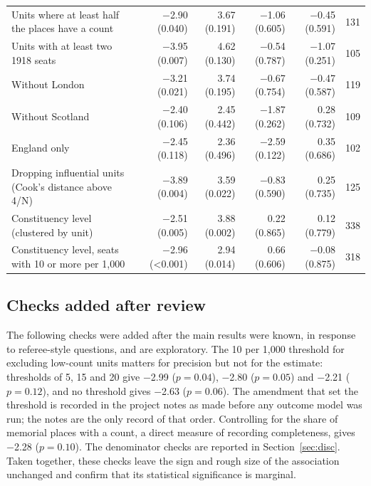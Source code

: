 \documentclass[11pt,a4paper]{article}
\begin{document}
\begin{table}[tbp]
\begin{tabular}{p{6.2cm}rrrrr}
Units where at least half the places have a count & $-$2.90 (0.040) & 3.67 (0.191) & $-$1.06 (0.605) & $-$0.45 (0.591) & 131\\
Units with at least two 1918 seats & $-$3.95 (0.007) & 4.62 (0.130) & $-$0.54 (0.787) & $-$1.07 (0.251) & 105\\
Without London & $-$3.21 (0.021) & 3.74 (0.195) & $-$0.67 (0.754) & $-$0.47 (0.587) & 119\\
Without Scotland & $-$2.40 (0.106) & 2.45 (0.442) & $-$1.87 (0.262) & 0.28 (0.732) & 109\\
England only & $-$2.45 (0.118) & 2.36 (0.496) & $-$2.59 (0.122) & 0.35 (0.686) & 102\\
Dropping influential units (Cook's distance above 4/N) & $-$3.89 (0.004) & 3.59 (0.022) & $-$0.83 (0.590) & 0.25 (0.735) & 125\\
Constituency level (clustered by unit) & $-$2.51 (0.005) & 3.88 (0.002) & 0.22 (0.865) & 0.12 (0.779) & 338\\
Constituency level, seats with 10 or more per 1,000 & $-$2.96 (<0.001) & 2.94 (0.014) & 0.66 (0.606) & $-$0.08 (0.875) & 318\\
\bottomrule\end{tabular}\end{table}

\subsection{Checks added after review}\label{sec:review}
The following checks were added after the main results were known, in response to referee-style questions, and are exploratory. The 10 per 1,000 threshold for excluding low-count units matters for precision but not for the estimate: thresholds of 5, 15 and 20 give $-$2.99 ($p=0.04$), $-$2.80 ($p=0.05$) and $-$2.21 ($p=0.12$), and no threshold gives $-$2.63 ($p=0.06$). The amendment that set the threshold is recorded in the project notes as made before any outcome model was run; the notes are the only record of that order. Controlling for the share of memorial places with a count, a direct measure of recording completeness, gives $-$2.28 ($p=0.10$). The denominator checks are reported in Section~\ref{sec:disc}. Taken together, these checks leave the sign and rough size of the association unchanged and confirm that its statistical significance is marginal.
\end{document}
